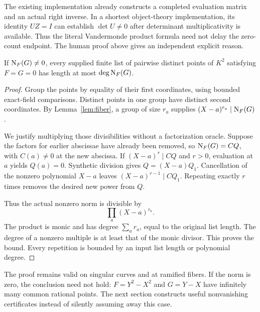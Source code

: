 The existing  implementation already constructs a completed evaluation matrix and an actual right inverse. In a shortest object-theory implementation, its identity $UZ=I$ can establish $\det U\ne0$ after determinant multiplicativity is available. Thus the literal Vandermonde product formula need not delay the zero-count endpoint. The human proof above gives an independent explicit reason.

\begin{theorem}\label{thm:finite-zero}
If $\operatorname{N}_F(G)\ne0$, every supplied finite list of pairwise distinct points of $K^2$ satisfying $F=G=0$ has length at most $\deg\operatorname{N}_F(G)$.
\end{theorem}
\begin{proof}
Group the points by equality of their first coordinates, using bounded exact-field comparisons. Distinct points in one group have distinct second coordinates. By Lemma~\ref{lem:fiber}, a group of size $r_a$ supplies $(X-a)^{r_a}\mid\operatorname{N}_F(G)$.

We justify multiplying those divisibilities without a factorization oracle. Suppose the factors for earlier abscissae have already been removed, so $\operatorname{N}_F(G)=CQ$, with $C(a)\ne0$ at the new abscissa. If $(X-a)^r\mid CQ$ and $r>0$, evaluation at $a$ yields $Q(a)=0$. Synthetic division gives $Q=(X-a)Q_1$. Cancellation of the nonzero polynomial $X-a$ leaves $(X-a)^{r-1}\mid CQ_1$. Repeating exactly $r$ times removes the desired new power from $Q$.

Thus the actual nonzero norm is divisible by
\[
 \prod_a(X-a)^{r_a}.
\]
The product is monic and has degree $\sum_a r_a$, equal to the original list length. The degree of a nonzero multiple is at least that of the monic divisor. This proves the bound. Every repetition is bounded by an input list length or polynomial degree.
\end{proof}

The proof remains valid on singular curves and at ramified fibers. If the norm is zero, the conclusion need not hold: $F=Y^2-X^2$ and $G=Y-X$ have infinitely many common rational points. The next section constructs useful nonvanishing certificates instead of silently assuming away this case.
